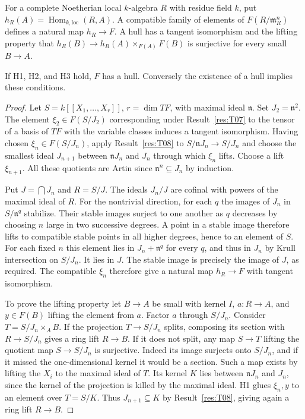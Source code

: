For a complete Noetherian local \(k\)-algebra \(R\) with residue
field \(k\), put \(h_R(A)=\operatorname{Hom}_{k,\mathrm{loc}}(R,A)\).
A compatible family of elements of \(F(R/\mathfrak m_R^n)\) defines
a natural map \(h_R\to F\). A hull has a tangent isomorphism and the
lifting property that \(h_R(B)\to h_R(A)\times_{F(A)}F(B)\)
is surjective for every small \(B\to A\).

\begin{theorem}\label{res:T09}
If H1, H2, and H3 hold, \(F\) has a hull. Conversely the
existence of a hull implies these conditions.
\end{theorem}
\begin{proof}
Let \(S=k[[X_1,\ldots,X_r]]\), \(r=\dim TF\), with maximal ideal
\(\mathfrak n\). Set \(J_2=\mathfrak n^2\). The element
\(\xi_2\in F(S/J_2)\) corresponding under Result~\ref{res:T07}
to the tensor of a basis of \(TF\) with the variable classes induces
a tangent isomorphism. Having chosen \(\xi_n\in F(S/J_n)\), apply
Result~\ref{res:T08} to
\(S/\mathfrak n J_n\to S/J_n\) and choose the smallest ideal
\(J_{n+1}\) between \(\mathfrak n J_n\) and \(J_n\) through which
\(\xi_n\) lifts. Choose a lift \(\xi_{n+1}\).
All these quotients are Artin since \(\mathfrak n^n\subseteq J_n\)
by induction.

Put \(J=\bigcap J_n\) and \(R=S/J\). The ideals \(J_n/J\) are
cofinal with powers of the maximal ideal of \(R\).
For the nontrivial direction, for each \(q\) the images of \(J_n\) in
\(S/\mathfrak n^q\) stabilize. Their stable images surject to one
another as \(q\) decreases by choosing \(n\) large in two successive
degrees. A point in a stable image therefore lifts to compatible
stable points in all higher degrees, hence to an element of \(S\).
For each fixed \(n\) this element lies in \(J_n+\mathfrak n^q\)
for every \(q\), and thus in \(J_n\) by Krull intersection on
\(S/J_n\). It lies in \(J\). The stable image is precisely the
image of \(J\), as required. The compatible \(\xi_n\) therefore
give a natural map \(h_R\to F\) with tangent isomorphism.

To prove the lifting property let \(B\to A\) be small with kernel
\(I\), \(a:R\to A\), and \(y\in F(B)\) lifting the element from \(a\).
Factor \(a\) through \(S/J_n\). Consider \(T=S/J_n\times_A B\).
If the projection \(T\to S/J_n\) splits, composing its section
with \(R\to S/J_n\) gives a ring lift \(R\to B\).
If it does not split, any map \(S\to T\) lifting the quotient map
\(S\to S/J_n\) is surjective. Indeed its image surjects onto
\(S/J_n\), and if it missed the one-dimensional kernel it would
be a section. Such a map exists by lifting the \(X_i\) to the
maximal ideal of \(T\). Its kernel \(K\) lies between
\(\mathfrak n J_n\) and \(J_n\), since the kernel of the projection
is killed by the maximal ideal. H1 glues \(\xi_n,y\) to an
element over \(T=S/K\). Thus \(J_{n+1}\subseteq K\) by
Result~\ref{res:T08}, giving again a ring lift \(R\to B\).


\end{proof}
